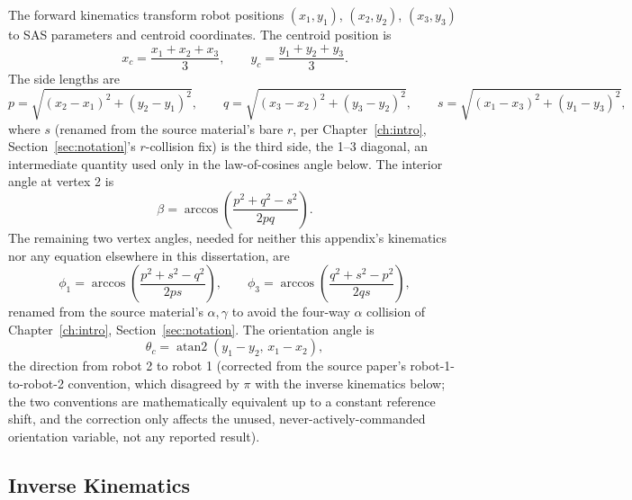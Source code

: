 \documentclass[12pt, letterpaper, oneside]{report}
\begin{document}
The forward kinematics transform robot positions $(x_1,y_1)$, $(x_2,y_2)$,
$(x_3,y_3)$ to SAS parameters and centroid coordinates. The centroid
position is
\begin{equation}
x_c = \frac{x_1+x_2+x_3}{3}, \qquad y_c = \frac{y_1+y_2+y_3}{3}.
\end{equation}
The side lengths are
\begin{equation}
p = \sqrt{(x_2-x_1)^2+(y_2-y_1)^2}, \qquad
q = \sqrt{(x_3-x_2)^2+(y_3-y_2)^2}, \qquad
s = \sqrt{(x_1-x_3)^2+(y_1-y_3)^2},
\end{equation}
where $s$ (renamed from the source material's bare $r$, per
Chapter~\ref{ch:intro}, Section~\ref{sec:notation}'s $r$-collision fix) is
the third side, the 1--3 diagonal, an intermediate quantity used only in the
law-of-cosines angle below. The interior angle at vertex 2 is
\begin{equation}
\beta = \arccos\left(\frac{p^2+q^2-s^2}{2pq}\right).
\end{equation}
The remaining two vertex angles, needed for neither this appendix's
kinematics nor any equation elsewhere in this dissertation, are
\begin{equation}
\phi_1 = \arccos\left(\frac{p^2+s^2-q^2}{2ps}\right), \qquad
\phi_3 = \arccos\left(\frac{q^2+s^2-p^2}{2qs}\right),
\end{equation}
renamed from the source material's $\alpha,\gamma$ to avoid the four-way
$\alpha$ collision of Chapter~\ref{ch:intro}, Section~\ref{sec:notation}.
The orientation angle is
\begin{equation}
\theta_c = \operatorname{atan2}(y_1-y_2,\,x_1-x_2),
\end{equation}
the direction from robot 2 to robot 1 (corrected from the source paper's
robot-1-to-robot-2 convention, which disagreed by $\pi$ with the inverse
kinematics below; the two conventions are mathematically equivalent up to a
constant reference shift, and the correction only affects the unused,
never-actively-commanded orientation variable, not any reported result).

\subsection{Inverse Kinematics}
\end{document}
